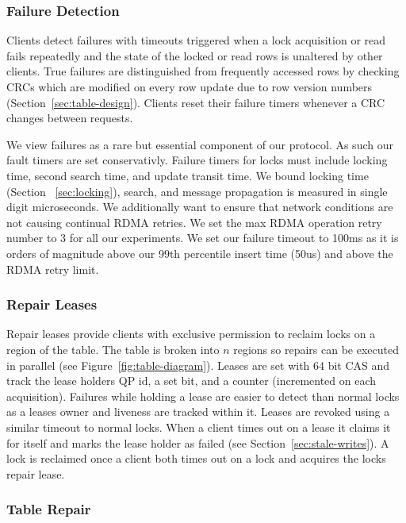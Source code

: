 \subsubsection{Failure Detection} 

Clients detect failures with timeouts triggered when a lock
acquisition or read fails repeatedly and the state of the
locked or read rows is unaltered by other clients.  True
failures are distinguished from frequently accessed rows by
checking CRCs which are modified on every row update due to
row version numbers (Section~\ref{sec:table-design}).
Clients reset their failure timers whenever a CRC changes
between requests.


 We view failures
as a rare but essential component of our protocol. As such
our fault timers are set conservativly. Failure timers for
locks must include locking time, second search time, and
update transit time. We bound locking time (Section
~\ref{sec:locking}), search, and message propagation is
measured in single digit microseconds. We additionally want
to ensure that network conditions are not causing continual
RDMA retries. We set the max RDMA operation retry number to
3 for all our experiments. We set our failure timeout to
100ms as it is orders of magnitude above our 99th percentile
insert time (50us) and above the RDMA retry limit.


\subsubsection{Repair Leases}

Repair leases provide clients with exclusive permission to
reclaim locks on a region of the table. The table is broken
into $n$ regions so repairs can be executed in parallel (see
Figure~\ref{fig:table-diagram}). Leases are set with 64 bit
CAS and track the lease holders QP id, a set bit, and a
counter (incremented on each acquisition).  Failures while
holding a lease are easier to detect than normal locks as a
leases owner and liveness are tracked within it.  Leases are
revoked using a similar timeout to normal locks. When a
client times out on a lease it claims it for itself and
marks the lease holder as failed (see
Section~\ref{sec:stale-writes}).  A lock is reclaimed once a
client both times out on a lock and acquires the locks
repair lease. 


\subsubsection{Table Repair} 
\label{sec:table-repair}

